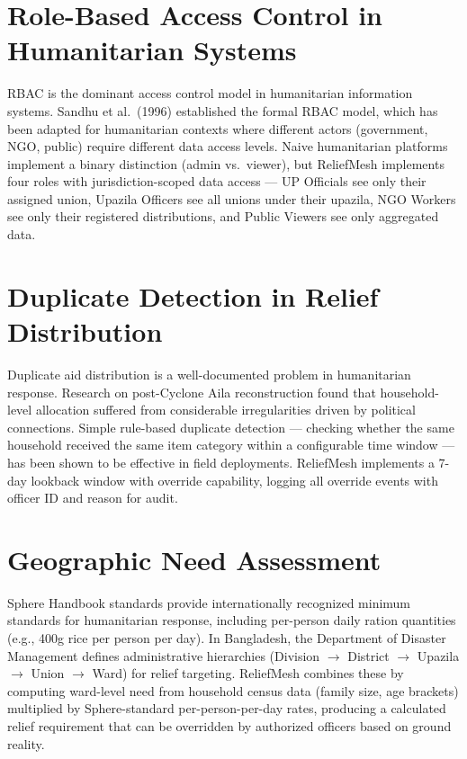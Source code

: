 \section{Role-Based Access Control in Humanitarian Systems}

RBAC is the dominant access control model in humanitarian information systems. Sandhu et al.\ (1996) established the formal RBAC model, which has been adapted for humanitarian contexts where different actors (government, NGO, public) require different data access levels. Naive humanitarian platforms implement a binary distinction (admin vs.\ viewer), but ReliefMesh implements four roles with jurisdiction-scoped data access --- UP Officials see only their assigned union, Upazila Officers see all unions under their upazila, NGO Workers see only their registered distributions, and Public Viewers see only aggregated data.

\section{Duplicate Detection in Relief Distribution}

Duplicate aid distribution is a well-documented problem in humanitarian response. Research on post-Cyclone Aila reconstruction found that household-level allocation suffered from considerable irregularities driven by political connections. Simple rule-based duplicate detection --- checking whether the same household received the same item category within a configurable time window --- has been shown to be effective in field deployments. ReliefMesh implements a 7-day lookback window with override capability, logging all override events with officer ID and reason for audit.

\section{Geographic Need Assessment}

Sphere Handbook standards provide internationally recognized minimum standards for humanitarian response, including per-person daily ration quantities (e.g., 400g rice per person per day). In Bangladesh, the Department of Disaster Management defines administrative hierarchies (Division $\rightarrow$ District $\rightarrow$ Upazila $\rightarrow$ Union $\rightarrow$ Ward) for relief targeting. ReliefMesh combines these by computing ward-level need from household census data (family size, age brackets) multiplied by Sphere-standard per-person-per-day rates, producing a calculated relief requirement that can be overridden by authorized officers based on ground reality.

